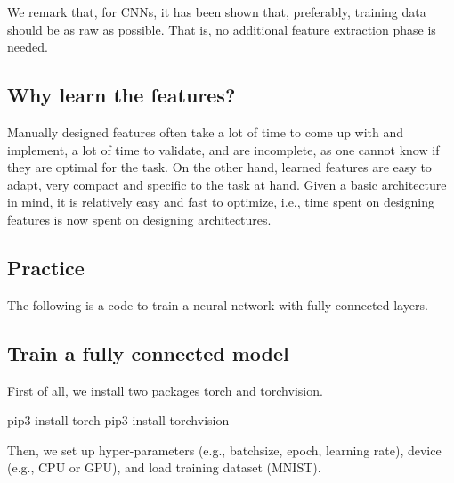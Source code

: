 We remark that, for CNNs, it has been shown that, preferably, training data should be as raw as possible. That is, no additional feature extraction phase  is needed. 



\subsection*{Why learn the features?}

Manually designed features 
often take a lot of time to come up with and implement, a lot of time to validate, and are incomplete, as one cannot know if they are optimal for the task. 
%
On the other hand, learned features 
are easy to adapt,  
very compact and specific to the task at hand. 
Given a basic architecture in mind, it is relatively easy and fast to optimize, i.e., 
time spent on designing features is now spent on designing architectures. 

\newpage
\subsection{Practice}

The following is a code to train a neural network with fully-connected layers. 

\subsection*{Train a fully connected model}

First of all, we install two packages torch and torchvision.

\begin{cmds}
pip3 install torch
pip3 install torchvision
\end{cmds}

Then, we set up hyper-parameters (e.g., batchsize, epoch, learning rate), device (e.g., CPU or GPU), and load training dataset (MNIST). 

